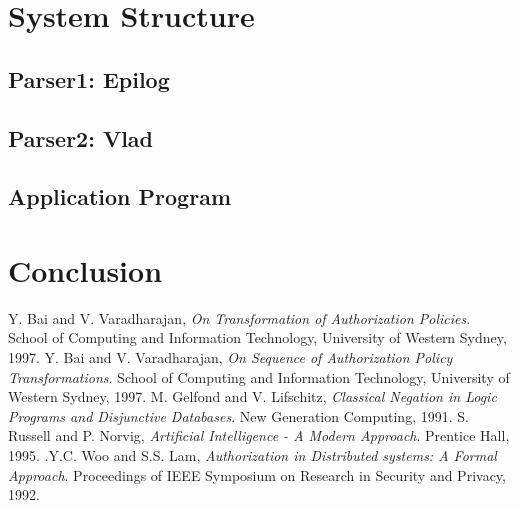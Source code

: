 \documentclass[a4paper,draft]{article}
\begin{document}
    \pagebreak

  \section{System Structure}

    \subsection{Parser1: Epilog}

    \subsection{Parser2: Vlad}

    \subsection{Application Program}

    \pagebreak

  \section{Conclusion}

    \pagebreak

  \begin{thebibliography}{}
    Y. Bai and V. Varadharajan, \emph{On Transformation of Authorization Policies}. School of Computing and Information Technology, University of Western Sydney, 1997.
    Y. Bai and V. Varadharajan, \emph{On Sequence of Authorization Policy Transformations}. School of Computing and Information Technology, University of Western Sydney, 1997.
    M. Gelfond and V. Lifschitz, \emph{Classical Negation in Logic Programs and Disjunctive Databases}. New Generation Computing, 1991.
    S. Russell and P. Norvig, \emph{Artificial Intelligence - A Modern Approach}. Prentice Hall, 1995.
    .Y.C. Woo and S.S. Lam, \emph{Authorization in Distributed systems: A Formal Approach}. Proceedings of IEEE Symposium on Research in Security and Privacy, 1992.
  \end{thebibliography}
\end{document}
